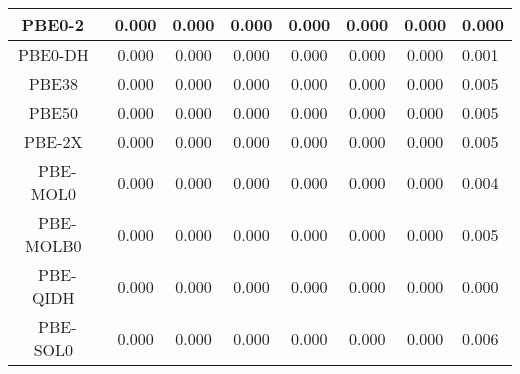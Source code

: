 \begin{tabular}{|c|c|c|c|c|c|c|l|}
                                       PBE0-2~\cite{Chai2012_121} &                0.000 &                          0.000 &             0.000 &                        0.000 &                0.000 &                0.000 &                       0.000 \\ \hline
                                PBE0-DH~\cite{Bremond2011_024106} &                0.000 &                          0.000 &             0.000 &                        0.000 &                0.000 &                0.000 &                       0.001 \\ \hline
                                   PBE38~\cite{Grimme2010_154104} &                0.000 &                          0.000 &             0.000 &                        0.000 &                0.000 &                0.000 &                       0.005 \\ \hline
                                  PBE50~\cite{Bernard2012_204103} &                0.000 &                          0.000 &             0.000 &                        0.000 &                0.000 &                0.000 &                       0.005 \\ \hline
                                 PBE-2X~\cite{Tahchieva2018_4806} &                0.000 &                          0.000 &             0.000 &                        0.000 &                0.000 &                0.000 &                       0.005 \\ \hline
                              PBE-MOL0~\cite{delCampo2012_104108} &                0.000 &                          0.000 &             0.000 &                        0.000 &                0.000 &                0.000 &                       0.004 \\ \hline
                             PBE-MOLB0~\cite{delCampo2012_104108} &                0.000 &                          0.000 &             0.000 &                        0.000 &                0.000 &                0.000 &                       0.005 \\ \hline
                               PBE-QIDH~\cite{Bremond2014_031101} &                0.000 &                          0.000 &             0.000 &                        0.000 &                0.000 &                0.000 &                       0.000 \\ \hline
                              PBE-SOL0~\cite{delCampo2012_104108} &                0.000 &                          0.000 &             0.000 &                        0.000 &                0.000 &                0.000 &                       0.006 \\ \hline

\end{tabular}
